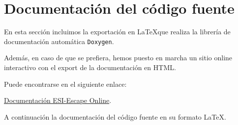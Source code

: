 
\section{Documentación del código fuente}

En esta sección incluimos la exportación en \LaTeX que realiza la librería de documentación automática \texttt{Doxygen}. 

\bigskip

Además, en caso de que se prefiera,
hemos puesto en marcha un sitio online interactivo con el export de la documentación en HTML. 

\bigskip

Puede encontrarse en el siguiente enlace:

\bigskip

\href{https://pn3m0n1c.github.io/ESIscape/}{Documentación ESI-Escape Online}.

\bigskip

A continuación la documentación del código fuente en su formato \LaTeX.